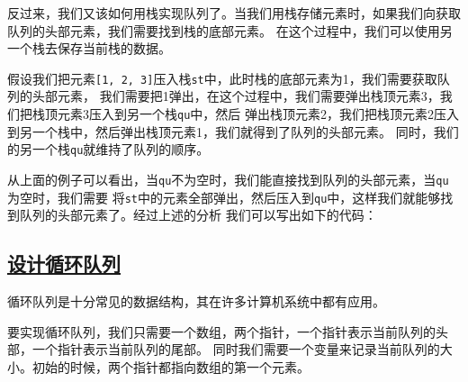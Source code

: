 \documentclass[../../main.tex]{subfiles}
\begin{document}
反过来，我们又该如何用栈实现队列了。当我们用栈存储元素时，如果我们向获取队列的头部元素，我们需要找到栈的底部元素。
在这个过程中，我们可以使用另一个栈去保存当前栈的数据。

\begin{example}
  假设我们把元素\texttt{[1, 2, 3]}压入栈\texttt{st}中，此时栈的底部元素为1，我们需要获取队列的头部元素，
  我们需要把1弹出，在这个过程中，我们需要弹出栈顶元素3，我们把栈顶元素3压入到另一个栈\texttt{qu}中，然后
  弹出栈顶元素2，我们把栈顶元素2压入到另一个栈中，然后弹出栈顶元素1，我们就得到了队列的头部元素。
  同时，我们的另一个栈\texttt{qu}就维持了队列的顺序。
\end{example}

从上面的例子可以看出，当\texttt{qu}不为空时，我们能直接找到队列的头部元素，当\texttt{qu}为空时，我们需要
将\texttt{st}中的元素全部弹出，然后压入到\texttt{qu}中，这样我们就能够找到队列的头部元素了。经过上述的分析
我们可以写出如下的代码：



\subsection{\href{https://leetcode-cn.com/problems/design-circular-queue/}{设计循环队列}}

循环队列是十分常见的数据结构，其在许多计算机系统中都有应用。

要实现循环队列，我们只需要一个数组，两个指针，一个指针表示当前队列的头部，一个指针表示当前队列的尾部。
同时我们需要一个变量来记录当前队列的大小。初始的时候，两个指针都指向数组的第一个元素。

\end{document}
